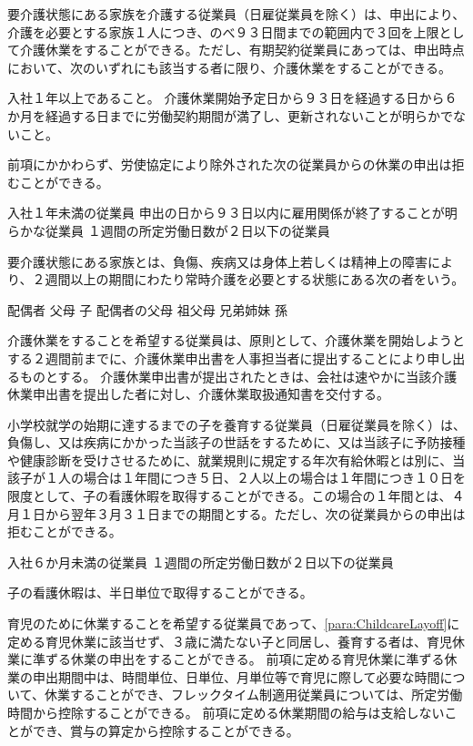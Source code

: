 \documentclass[10pt,a4paper,uplatex]{jsarticle}
\begin{document}
要介護状態にある家族を介護する従業員（日雇従業員を除く）は、申出により、介護を必要とする家族１人につき、のべ９３日間までの範囲内で３回を上限として介護休業をすることができる。ただし、有期契約従業員にあっては、申出時点において、次のいずれにも該当する者に限り、介護休業をすることができる。
\label{para:NursingLayoff}
\begin{enumerate}
    \itm 入社１年以上であること。
    \itm 介護休業開始予定日から９３日を経過する日から６か月を経過する日までに労働契約期間が満了し、更新されないことが明らかでないこと。
\end{enumerate}
\term 前項にかかわらず、労使協定により除外された次の従業員からの休業の申出は拒むことができる。
\begin{enumerate}
    \itm 入社１年未満の従業員
    \itm 申出の日から９３日以内に雇用関係が終了することが明らかな従業員
    \itm １週間の所定労働日数が２日以下の従業員
\end{enumerate}
\term 要介護状態にある家族とは、負傷、疾病又は身体上若しくは精神上の障害により、２週間以上の期間にわたり常時介護を必要とする状態にある次の者をいう。
\begin{enumerate}
    \itm 配偶者
    \itm 父母
    \itm 子
    \itm 配偶者の父母
    \itm 祖父母
    \itm 兄弟姉妹
    \itm 孫
\end{enumerate}
\term 介護休業をすることを希望する従業員は、原則として、介護休業を開始しようとする２週間前までに、介護休業申出書を人事担当者に提出することにより申し出るものとする。
\term 介護休業申出書が提出されたときは、会社は速やかに当該介護休業申出書を提出した者に対し、介護休業取扱通知書を交付する。

小学校就学の始期に達するまでの子を養育する従業員（日雇従業員を除く）は、負傷し、又は疾病にかかった当該子の世話をするために、又は当該子に予防接種や健康診断を受けさせるために、就業規則に規定する年次有給休暇とは別に、当該子が１人の場合は１年間につき５日、２人以上の場合は１年間につき１０日を限度として、子の看護休暇を取得することができる。この場合の１年間とは、４月１日から翌年３月３１日までの期間とする。ただし、次の従業員からの申出は拒むことができる。
\label{para:ChildNursingAbsence}
\begin{enumerate}
    \itm 入社６か月未満の従業員
    \itm １週間の所定労働日数が２日以下の従業員
\end{enumerate}
\term 子の看護休暇は、半日単位で取得することができる。

育児のために休業することを希望する従業員であって、\ref{para:ChildcareLayoff}に定める育児休業に該当せず、３歳に満たない子と同居し、養育する者は、育児休業に準ずる休業の申出をすることができる。
\term
前項に定める育児休業に準ずる休業の申出期間中は、時間単位、日単位、月単位等で育児に際して必要な時間について、休業することができ、フレックタイム制適用従業員については、所定労働時間から控除することができる。
\term
前項に定める休業期間の給与は支給しないことができ、賞与の算定から控除することができる。
\end{document}
